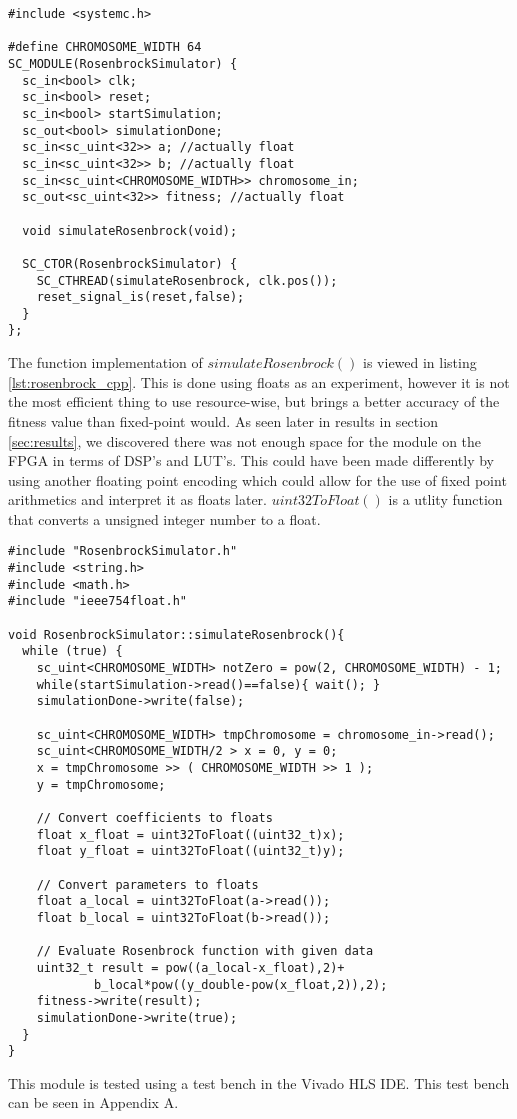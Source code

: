 \begin{lstlisting}[style=customc++,caption={RosenbrockSimulator.h},label={lst:rosenbrock_h}]
#include <systemc.h>

#define CHROMOSOME_WIDTH 64
SC_MODULE(RosenbrockSimulator) {
  sc_in<bool> clk;
  sc_in<bool> reset;
  sc_in<bool> startSimulation;
  sc_out<bool> simulationDone;
  sc_in<sc_uint<32>> a; //actually float
  sc_in<sc_uint<32>> b; //actually float
  sc_in<sc_uint<CHROMOSOME_WIDTH>> chromosome_in;
  sc_out<sc_uint<32>> fitness; //actually float

  void simulateRosenbrock(void);

  SC_CTOR(RosenbrockSimulator) {
    SC_CTHREAD(simulateRosenbrock, clk.pos());
    reset_signal_is(reset,false);
  }
};
\end{lstlisting}

The function implementation of $simulateRosenbrock()$ is viewed in listing \ref{lst:rosenbrock_cpp}. This is done using floats as an experiment, however it is not the most efficient thing to use resource-wise, but brings a better accuracy of the fitness value than fixed-point would. As seen later in results in section \ref{sec:results}, we discovered there was not enough space for the module on the FPGA in terms of DSP's and LUT's. This could have been made differently by using another floating point encoding which could allow for the use of fixed point arithmetics and interpret it as floats later. $uint32ToFloat()$ is a utlity function that converts a unsigned integer number to a float.

\begin{lstlisting}[style=customc++,caption={RosenbrockSimulator.cpp},label={lst:rosenbrock_cpp}]
#include "RosenbrockSimulator.h"
#include <string.h>
#include <math.h>
#include "ieee754float.h"

void RosenbrockSimulator::simulateRosenbrock(){
  while (true) {
    sc_uint<CHROMOSOME_WIDTH> notZero = pow(2, CHROMOSOME_WIDTH) - 1;
    while(startSimulation->read()==false){ wait(); }
    simulationDone->write(false);
    
    sc_uint<CHROMOSOME_WIDTH> tmpChromosome = chromosome_in->read();
    sc_uint<CHROMOSOME_WIDTH/2 > x = 0, y = 0;
    x = tmpChromosome >> ( CHROMOSOME_WIDTH >> 1 );
    y = tmpChromosome;
    
    // Convert coefficients to floats
    float x_float = uint32ToFloat((uint32_t)x);
   	float y_float = uint32ToFloat((uint32_t)y);
   	
   	// Convert parameters to floats
   	float a_local = uint32ToFloat(a->read());
   	float b_local = uint32ToFloat(b->read());
   
   	// Evaluate Rosenbrock function with given data
    uint32_t result = pow((a_local-x_float),2)+
    		b_local*pow((y_double-pow(x_float,2)),2);
    fitness->write(result);
    simulationDone->write(true);
  }
}
\end{lstlisting}

This module is tested using a test bench in the Vivado HLS IDE. This test bench can be seen in Appendix A.



